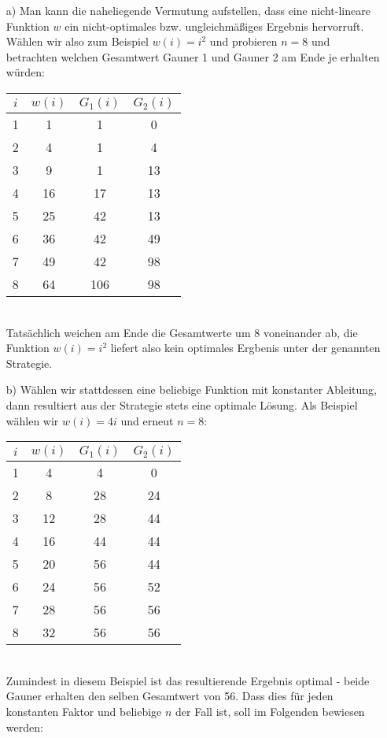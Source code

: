 \documentclass{article}
\begin{document}
    \begin{enumerate}
        \item[a)] Man kann die naheliegende Vermutung aufstellen, dass eine nicht-lineare Funktion $w$ ein nicht-optimales bzw. ungleichmäßiges Ergebnis hervorruft. Wählen wir also zum Beispiel $w(i) = i^2$ und probieren $n=8$ und betrachten welchen Gesamtwert Gauner 1 und Gauner 2 am Ende je erhalten würden:
        \begin{table*}[h]
            \centering
            \begin{tabular}{c|c|cc}
                $i$ & $w(i)$ & $G_1(i)$ & $G_2(i)$ \\ \hline
                1 & 1  & 1  & 0  \\ \hline
                2 & 4  & 1  & 4  \\
                3 & 9  & 1  & 13 \\ \hline
                4 & 16 & 17 & 13 \\
                5 & 25 & 42 & 13 \\ \hline
                6 & 36 & 42 & 49 \\
                7 & 49 & 42 & 98 \\ \hline
                8 & 64 & 106 & 98
            \end{tabular}
        \end{table*} \\
        Tatsächlich weichen am Ende die Gesamtwerte um 8 voneinander ab, die Funktion $w(i) = i^2$ liefert also kein optimales Ergbenis unter der genannten Strategie.
        \item[b)]
        Wählen wir stattdessen eine beliebige Funktion mit konstanter Ableitung, dann resultiert aus der Strategie stets eine optimale Lösung. Als Beispiel wählen wir $w(i) = 4i$ und erneut $n=8$:
        \begin{table*}[h]
            \centering
            \begin{tabular}{c|c|cc}
                $i$ & $w(i)$ & $G_1(i)$ & $G_2(i)$ \\ \hline
                1 & 4  & 4 & 0 \\ \hline
                2 & 8  & 28 & 24 \\
                3 & 12 & 28 & 44 \\ \hline
                4 & 16 & 44 & 44 \\
                5 & 20 & 56 & 44 \\ \hline
                6 & 24 & 56 & 52 \\
                7 & 28 & 56 & 56 \\ \hline
                8 & 32 & 56 & 56
            \end{tabular}
        \end{table*}\\
        Zumindest in diesem Beispiel ist das resultierende Ergebnis optimal - beide Gauner erhalten den selben Gesamtwert von 56. Dass dies für jeden konstanten Faktor und beliebige $n$ der Fall ist, soll im Folgenden bewiesen werden: 


\end{enumerate}
\end{document}

